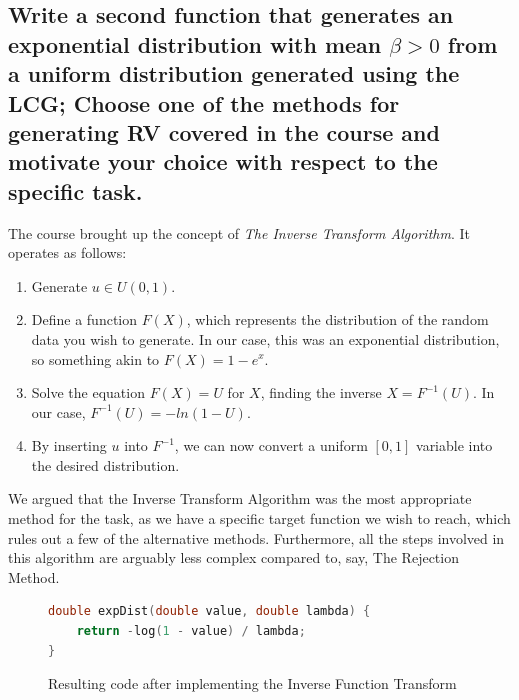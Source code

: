 \documentclass[a4paper, titlepage,12pt]{article}
\begin{document}
		\subsection{Write a second function that generates an exponential distribution with mean $\beta>0$ from a uniform distribution generated using the LCG; Choose one of the methods for generating RV covered in the course and motivate your choice with respect to the specific task.}
		The course brought up the concept of \emph{The Inverse Transform Algorithm}. It operates as follows:
		\begin{enumerate}
			\item Generate $u \in U(0, 1)$.
			\item Define a function $F(X)$, which represents the distribution of the random data you wish to generate. In our case, this was an exponential distribution, so something akin to $F(X) = 1 - e^x$.
			\item Solve the equation $F(X) = U$ for $X$, finding the inverse $X = F^{-1}(U)$. In our case, $F^{-1}(U) = -ln(1-U)$.
			\item By inserting $u$ into $F^{-1}$, we can now convert a uniform $[0, 1]$ variable into the desired distribution.
		\end{enumerate}
		We argued that the Inverse Transform Algorithm was the most appropriate method for the task, as we have a specific target function we wish to reach, which rules out a few of the alternative methods. Furthermore, all the steps involved in this algorithm are arguably less complex compared to, say, The Rejection Method.
		\begin{figure}[h!]
			\begin{lstlisting}[language=c++]
double expDist(double value, double lambda) {
	return -log(1 - value) / lambda;
}
			\end{lstlisting}
			\caption{Resulting code after implementing the Inverse Function Transform}
			\label{fig:invfunctrans}
		\end{figure}
			
\end{document}
